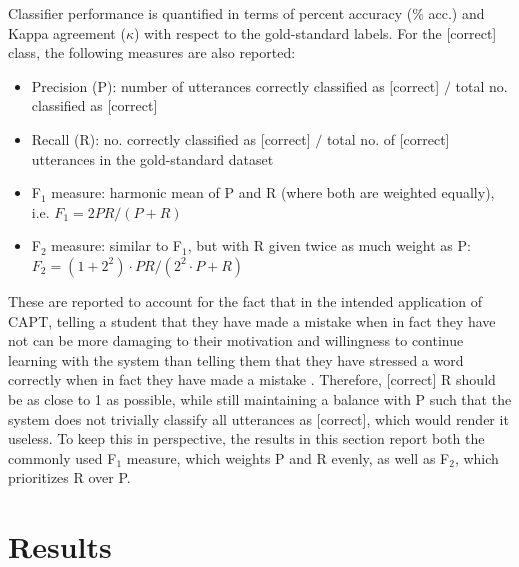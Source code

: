 \documentclass[a4paper]{article}
\begin{document}
		Classifier performance is quantified in terms of percent accuracy (\% acc.) and Kappa agreement ($\kappa$) with respect to the gold-standard labels. For the [correct] class, 
	the following measures are also reported:
	\begin{itemize}
			\item{Precision (P): number of utterances correctly classified as [correct] $/$ total no. classified as [correct]
			}
			\item{Recall (R): no. correctly classified as [correct] $/$ total no. of [correct] utterances in the gold-standard dataset
			}
			\item{F$_1$ measure:
			harmonic mean of P and R (where both are weighted equally), i.e. $F_1 = 2PR/(P+R)$
			}
			\item{F$_2$ measure: 
			similar to F$_1$, but with R given twice as much weight as P: $F_2 = (1+2^2) \cdot PR/(2^2 \cdot P+R)$ %
			}
	\end{itemize}
	These are reported to account for the fact that in the intended application of CAPT, telling a student that they have made a mistake when in fact they have not can be more damaging to their motivation and willingness to continue learning with the system than telling them that they have stressed a word correctly when in fact they have made a mistake \cite{Neri2002}. Therefore, [correct] R should be as close to 1 as possible, while still maintaining a balance with P such that the system does not trivially classify all utterances as [correct], which would render it useless. To keep this in perspective, the results in this section report both the commonly used F$_1$ measure, which weights P and R evenly, as well as F$_2$, which prioritizes R over P.
		

	\section{Results}
	\label{sec:results}
	
\end{document}
